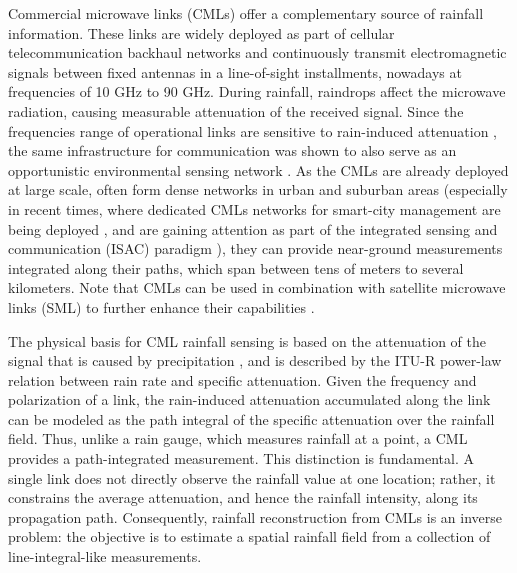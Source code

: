 \documentclass[a4paper,fleqn]{cas-sc}
\newcommand{\notebox}[3]{%
  \begingroup
  \setlength{\fboxsep}{2pt}%
  \fcolorbox{#1}{#2}{\textsf{\footnotesize #3}}%
  \endgroup
}
\DeclareRobustCommand{\editnote}[1]{%
  \texorpdfstring{%
    \nobreak\hfill
    \mbox{\notebox{red!50!black}{red!10}{#1}}%
  }{}%
}
\renewcommand{\editnote}[1]{}
\begin{document}
Commercial microwave links (CMLs) offer a complementary source of rainfall information. These links are widely deployed as part of cellular telecommunication backhaul networks and continuously transmit electromagnetic signals between fixed antennas in a line-of-sight installments, nowadays at frequencies of 10 GHz to 90 GHz. During rainfall, raindrops affect the microwave radiation, causing measurable attenuation of the received signal. Since the frequencies range of operational links are sensitive to rain-induced attenuation \cite{ITU,gunn1954microwave,olsen1978rain}, the same infrastructure for communication was shown to also serve as an opportunistic environmental sensing network \cite{RemkoCountry2,chwala2019cml,fencl2015commercial}. As the CMLs are already deployed at large scale, often form dense networks in urban and suburban areas (especially in recent times, where dedicated CMLs networks for smart-city management are being deployed \cite{ostrometzky2024opportunistic,janco2022rain}, and are gaining attention as part of the integrated sensing and communication (ISAC) paradigm \cite{han2023potential}), they can provide near-ground measurements integrated along their paths, which span between tens of meters to several kilometers. Note that CMLs can be used in combination with satellite microwave links (SML) to further enhance their capabilities \cite{nebuloni2025review}. %

The physical basis for CML rainfall sensing is based on the attenuation of the signal that is caused by precipitation \cite{gunn1954microwave, olsen1978rain}, and is described by the ITU-R power-law relation\editnote{AK: We should cite the standard here, but which one is the right one?} between rain rate and specific attenuation. Given the frequency and polarization of a link, the rain-induced attenuation accumulated along the link can be modeled as the path integral of the specific attenuation over the rainfall field. Thus, unlike a rain gauge, which measures rainfall at a point, a CML provides a path-integrated measurement. This distinction is fundamental. A single link does not directly observe the rainfall value at one location; rather, it constrains the average attenuation, and hence the rainfall intensity, along its propagation path. Consequently, rainfall reconstruction from CMLs is an inverse problem: the objective is to estimate a spatial rainfall field from a collection of line-integral-like measurements.
\end{document}

